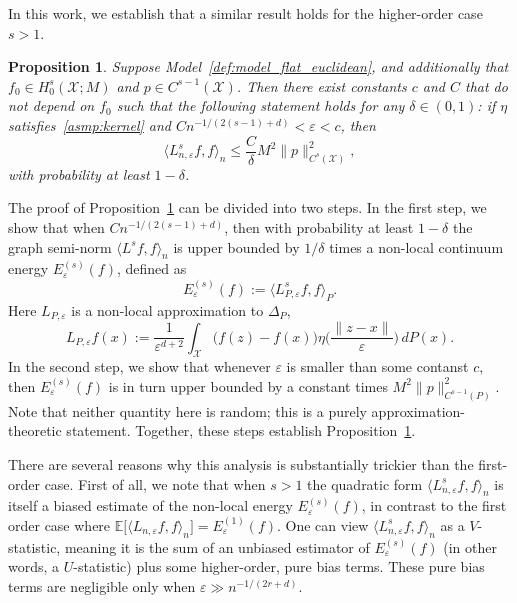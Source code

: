 \documentclass{article}
\newcommand{\1}{\mathbf{1}}
\newcommand{\mc}[1]{\mathcal{#1}}
\newcommand{\Ebb}{\mathbb{E}}
\newcommand{\dotp}[2]{\langle #1, #2 \rangle}
\theoremstyle{alden}
\theoremstyle{aldenthm}
\newtheorem{proposition}{Proposition}
\theoremstyle{definition}
\theoremstyle{remark}
\begin{document}
In this work, we establish that a similar result holds for the higher-order case $s > 1$. 

\begin{proposition}
	\label{prop:graph_seminorm_ho} 
	Suppose Model~\ref{def:model_flat_euclidean}, and additionally that $f_0 \in H_0^s(\mc{X};M)$ and $p \in C^{s - 1}(\mc{X})$. Then there exist constants $c$ and $C$ that do not depend on $f_0$ such that the following statement holds for any $\delta \in (0,1)$: if $\eta$ satisfies~\ref{asmp:kernel} and $Cn^{-1/(2(s - 1) + d)} < \varepsilon < c$, then
	\begin{equation}
	\label{eqn:graph_seminorm_ho}
	\dotp{L_{n,\varepsilon}^s f}{f}_n \leq \frac{C}{\delta} M^2 \|p\|_{C^{s}(\mc{X})}^2,
	\end{equation}
	with probability at least $1 - \delta$.
\end{proposition}
The proof of Proposition~\ref{prop:graph_seminorm_ho} can be divided into two steps. In the first step, we show that when $Cn^{-1/(2(s - 1) + d)}$, then with probability at least $1 - \delta$ the graph semi-norm $\dotp{L^s f}{f}_n$ is upper bounded by $1/\delta$ times a non-local continuum energy $E_{\varepsilon}^{(s)}(f)$, defined as
\begin{equation*}
E_{\varepsilon}^{(s)}(f) := \dotp{L_{P,\varepsilon}^sf}{f}_{P}.
\end{equation*}
Here $L_{P,\varepsilon}$ is a non-local approximation to $\Delta_P$, 
\begin{equation}
\label{eqn:nonlocal_laplacian}
L_{P,\varepsilon}f(x) := \frac{1}{\varepsilon^{d + 2}}\int_{\mc{X}}\bigl(f(z) - f(x)\bigr) \eta\biggl(\frac{\|z - x\|}{\varepsilon}\biggr) \,dP(x).
\end{equation}
In the second step, we show that whenever $\varepsilon$  is smaller than some contanst $c$, then $E_{\varepsilon}^{(s)}(f)$ is in turn upper bounded by a constant times $M^2 \|p\|_{C^{s - 1}(P)}^2$. Note that neither quantity here is random; this is a purely approximation-theoretic statement. Together, these steps establish Proposition~\ref{prop:graph_seminorm_ho}.

There are several reasons why this analysis is substantially trickier than the first-order case. First of all, we note that when $s > 1$ the quadratic form $\dotp{L_{n,\varepsilon}^s f}{f}_n$ is itself a biased estimate of the non-local energy $E_{\varepsilon}^{(s)}(f)$, in contrast to the first order case where $\Ebb\bigl[\dotp{L_{n,\varepsilon} f}{f}_n\bigr] = E_{\varepsilon}^{(1)}(f)$. One can view $\dotp{L_{n,\varepsilon}^s f}{f}_n$ as a $V$-statistic, meaning it is the sum of an unbiased estimator of $E_{\varepsilon}^{(s)}(f)$ (in other words, a $U$-statistic) plus some higher-order, pure bias terms. These pure bias terms are negligible only when $\varepsilon \gg n^{-1/(2r + d)}$. 
\end{document}

